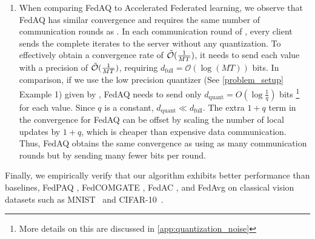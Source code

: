 \begin{enumerate}
    \item \label{contribution2} When comparing FedAQ to Accelerated Federated learning, we observe that FedAQ has similar convergence and requires the same number of communication rounds as \citet{yuan2020federated}. In each communication round of \citet{yuan2020federated}, every client sends the complete iterates to the server without any quantization. To effectively obtain a convergence rate of $\Tilde{\mathcal{O}}(\frac{1}{MT})$, it needs to send each value with a precision of $\Tilde{\mathcal{O}}(\frac{1}{MT})$, requiring $d_{\text{full}} = {\mathcal{O}}(\log{(MT)})$ bits. In comparison, if we use the low precision quantizer (See \cref{problem_setup} Example 1) given by \citet{alistarh2017qsgd}, FedAQ needs to send only $d_{\text{quant}} = O(\log \frac{1}{q})$ bits \footnote{More details on this are discussed in \cref{app:quantization_noise}} for each value. Since $q$ is a constant, $d_{\text{quant}} \ll d_{\text{full}}$. The extra $1+q$ term in the convergence for FedAQ can be offset by scaling the number of local updates by $1+q$, which is cheaper than expensive data communication. Thus, FedAQ obtains the same convergence as \citet{yuan2020federated} using as many communication rounds but by sending many fewer bits per round.
 

 \end{enumerate}
 
 Finally, we empirically verify that our algorithm exhibits better performance than baselines, FedPAQ \citep{reisizadeh2020fedpaq}, FedCOMGATE \citep{haddadpour2021federated}, FedAC \citep{yuan2020federated}, and FedAvg \citep{mcmahan2017communication} on classical vision datasets such as MNIST~\citep{lecun1998mnist} and CIFAR-10~\citep{krizhevsky2009learning}.